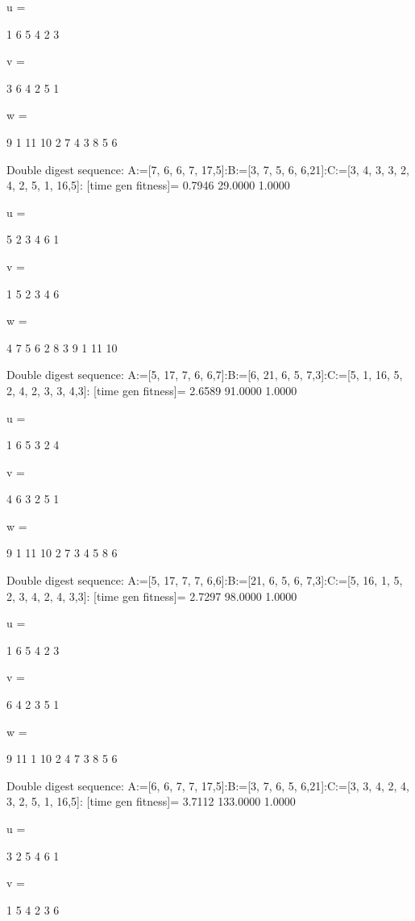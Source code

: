 u =

     1     6     5     4     2     3


v =

     3     6     4     2     5     1


w =

     9     1    11    10     2     7     4     3     8     5     6

Double digest sequence:
A:=[7, 6, 6, 7, 17,5]:B:=[3, 7, 5, 6, 6,21]:C:=[3, 4, 3, 3, 2, 4, 2, 5, 1, 16,5]:
[time gen fitness]=
    0.7946   29.0000    1.0000


u =

     5     2     3     4     6     1


v =

     1     5     2     3     4     6


w =

     4     7     5     6     2     8     3     9     1    11    10

Double digest sequence:
A:=[5, 17, 7, 6, 6,7]:B:=[6, 21, 6, 5, 7,3]:C:=[5, 1, 16, 5, 2, 4, 2, 3, 3, 4,3]:
[time gen fitness]=
    2.6589   91.0000    1.0000


u =

     1     6     5     3     2     4


v =

     4     6     3     2     5     1


w =

     9     1    11    10     2     7     3     4     5     8     6

Double digest sequence:
A:=[5, 17, 7, 7, 6,6]:B:=[21, 6, 5, 6, 7,3]:C:=[5, 16, 1, 5, 2, 3, 4, 2, 4, 3,3]:
[time gen fitness]=
    2.7297   98.0000    1.0000


u =

     1     6     5     4     2     3


v =

     6     4     2     3     5     1


w =

     9    11     1    10     2     4     7     3     8     5     6

Double digest sequence:
A:=[6, 6, 7, 7, 17,5]:B:=[3, 7, 6, 5, 6,21]:C:=[3, 3, 4, 2, 4, 3, 2, 5, 1, 16,5]:
[time gen fitness]=
    3.7112  133.0000    1.0000


u =

     3     2     5     4     6     1


v =

     1     5     4     2     3     6


